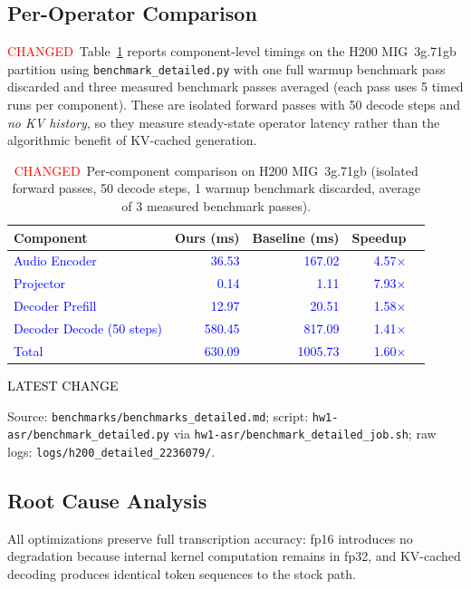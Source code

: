 \documentclass{article}
\newcommand{\chg}[1]{{\color{blue}#1}}
\newcommand{\chgcell}[1]{\textcolor{blue}{#1}}
\newcommand{\chglabel}{{\setlength{\fboxsep}{1pt}\colorbox{yellow!45}{\textcolor{red}{\scriptsize CHANGED}}}}
\newcommand{\latestchglabel}{{\setlength{\fboxsep}{1pt}\colorbox{yellow!65}{\textcolor{black}{\scriptsize LATEST CHANGE}}}}
\newcommand{\latestsource}[1]{%
  \par\noindent
  {\footnotesize \latestchglabel\ \parbox[t]{0.9\linewidth}{#1}}\par
}
\begin{document}
\subsection{Per-Operator Comparison}

\chglabel\ \chg{Table~\ref{tab:peroperator} reports component-level timings on the H200 MIG~3g.71gb partition using \texttt{benchmark\_detailed.py} with one full warmup benchmark pass discarded and three measured benchmark passes averaged (each pass uses 5 timed runs per component).  These are isolated forward passes with 50 decode steps and \emph{no KV history}, so they measure steady-state operator latency rather than the algorithmic benefit of KV-cached generation.}

\begin{table}[h]
\centering
\caption{\chglabel\ \chg{Per-component comparison on H200 MIG~3g.71gb (isolated forward passes, 50 decode steps, 1 warmup benchmark discarded, average of 3 measured benchmark passes).}}
\label{tab:peroperator}
\small
\begin{tabular}{@{}lrrrr@{}}
\toprule
\textbf{Component} & \textbf{Ours (ms)} & \textbf{Baseline (ms)} & \textbf{Speedup} \\
\midrule
\chgcell{Audio Encoder} & \chgcell{36.53} & \chgcell{167.02} & \chgcell{4.57$\times$} \\
\chgcell{Projector} & \chgcell{0.14} & \chgcell{1.11} & \chgcell{7.93$\times$} \\
\chgcell{Decoder Prefill} & \chgcell{12.97} & \chgcell{20.51} & \chgcell{1.58$\times$} \\
\chgcell{Decoder Decode (50 steps)} & \chgcell{580.45} & \chgcell{817.09} & \chgcell{1.41$\times$} \\
\midrule
\chgcell{Total} & \chgcell{630.09} & \chgcell{1005.73} & \chgcell{1.60$\times$} \\
\bottomrule
\end{tabular}
\end{table}

\latestsource{Source: \texttt{benchmarks/benchmarks\_detailed.md}; script: \texttt{hw1-asr/benchmark\_detailed.py} via \texttt{hw1-asr/benchmark\_detailed\_job.sh}; raw logs: \texttt{logs/h200\_detailed\_2236079/}.}

\subsection{Root Cause Analysis}

All optimizations preserve full transcription accuracy: fp16 introduces no degradation because internal kernel computation remains in fp32, and KV-cached decoding produces identical token sequences to the stock path.
\end{document}
